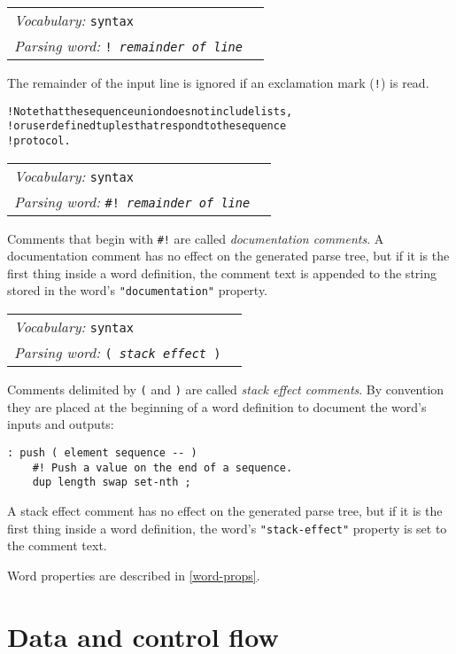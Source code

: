 \documentclass{book}
\newcommand{\vocabulary}[1]{\emph{Vocabulary:} \texttt{#1}&\\}
\newcommand{\parsingword}[2]{\index{\texttt{#1}}\emph{Parsing word:} \texttt{#2}&\\}
\newcommand{\wordtable}[1]{


\begin{tabularx}{12cm}{lX}
\hline
#1
\hline
\end{tabularx}

}
\begin{document}
\wordtable{
\vocabulary{syntax}
\parsingword{!}{!~\emph{remainder of line}}
}
The remainder of the input line is ignored if an exclamation mark (\texttt{!}) is read.
\begin{alltt}
! Note that the sequence union does not include lists,
! or user defined tuples that respond to the sequence
! protocol.
\end{alltt}
\wordtable{
\vocabulary{syntax}
\parsingword{hash!}{\#!~\emph{remainder of line}}
}
\newcommand{\doccommentglos}{}
\doccommentglos
Comments that begin with \texttt{\#!} are called \emph{documentation comments}.
A documentation comment has no effect on the generated parse tree, but if it is the first thing inside a word definition, the comment text is appended to the string stored in the word's \texttt{"documentation"} property. 
\wordtable{
\vocabulary{syntax}
\parsingword{(}{( \emph{stack effect} )}
}
\newcommand{\stackcommentglos}{}
\stackcommentglos
Comments delimited by \texttt{(} and \texttt{)} are called \emph{stack effect comments}. By convention they are placed at the beginning of a word definition to document the word's inputs and outputs:
\begin{verbatim}
: push ( element sequence -- )
    #! Push a value on the end of a sequence.
    dup length swap set-nth ;
\end{verbatim}
A stack effect comment has no effect on the generated parse tree, but if it is the first thing inside a word definition, the word's \texttt{"stack-effect"} property is set to the comment text.

Word properties are described in \ref{word-props}.

\section{Data and control flow}
\end{document}
